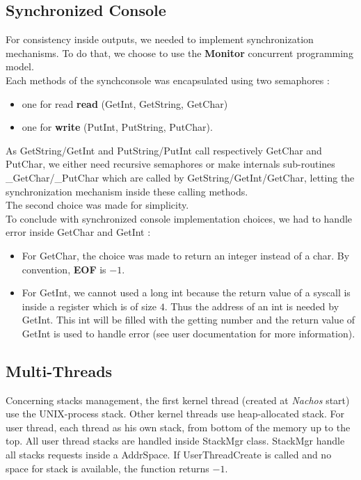 \subsection{Synchronized Console}

For consistency inside outputs, we needed to implement synchronization
mechanisms. To do that, we choose to use the \textbf{Monitor} concurrent
programming model.\\
Each methods of the synchconsole was encapsulated using two
semaphores :
\begin{itemize}
    \item one for read \textbf{read} (GetInt, GetString, GetChar)
    \item one for \textbf{write} (PutInt, PutString, PutChar).
\end{itemize}

As GetString/GetInt and PutString/PutInt call respectively GetChar and PutChar,
we either need recursive semaphores or make internals sub-routines
\_GetChar/\_PutChar which are called by GetString/GetInt/GetChar, letting the
synchronization mechanism inside these calling methods.\\
The second choice was made for simplicity.\\

To conclude with synchronized console implementation choices, we had to handle
error inside GetChar and GetInt :
\begin{itemize}
    \item For GetChar, the choice was made to return an integer instead of a char. By
convention, \textbf{EOF} is $-1$.
    \item For GetInt, we cannot used a long int because the return value of a syscall is
inside a register which is of size $4$. Thus the address of an int is needed by
GetInt. This int will be filled with the getting number and the return value of
GetInt is used to handle error (see user documentation for more information).
\end{itemize}

\subsection{Multi-Threads}

Concerning stacks management, the first kernel thread (created at \emph{Nachos}
start) use the UNIX-process stack. Other kernel threads use heap-allocated
stack. For user thread, each thread as his own stack, from bottom of the memory
up to the top. All user thread stacks are handled inside StackMgr class.
StackMgr handle all stacks requests inside a AddrSpace. If UserThreadCreate is
called and no space for stack is available, the function returns $-1$.\\

